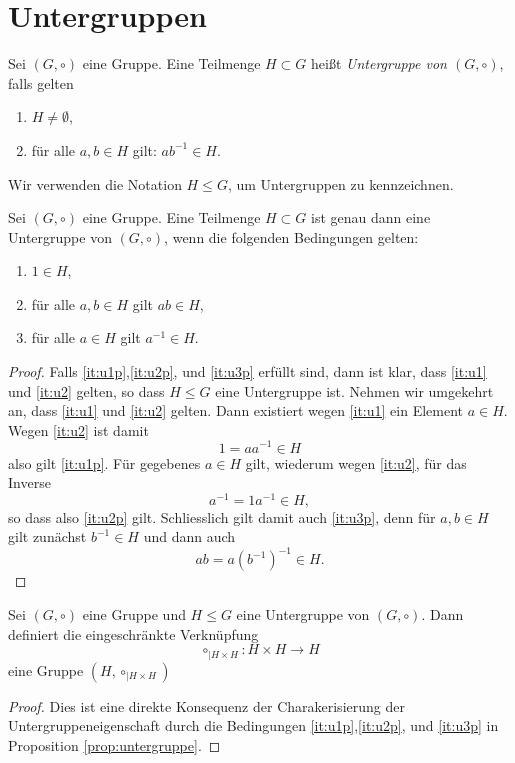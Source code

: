 \documentclass{book}
\begin{document}
\section{Untergruppen}%
\label{sec:untergruppen}

\begin{defi}
    Sei $(G,\circ)$ eine Gruppe. Eine Teilmenge $H \subset G$ heißt {\em Untergruppe von $(G,\circ)$}, falls gelten 
    \begin{enumerate}[leftmargin=1.2cm,label=(U\arabic*)]
        \item\label{it:u1} $H \neq \emptyset$,
        \item\label{it:u2} für alle $a,b \in H$ gilt: $a b^{-1} \in H$. 
    \end{enumerate}
    Wir verwenden die Notation $H \leq G$, um Untergruppen zu kennzeichnen.
\end{defi}

\begin{prop}
    \label{prop:untergruppe}
    Sei $(G,\circ)$ eine Gruppe. Eine Teilmenge $H \subset G$ ist genau dann
    eine Untergruppe von $(G,\circ)$, wenn die folgenden Bedingungen
    gelten:
    \begin{enumerate}[leftmargin=1.2cm,label=(U\arabic*')]
        \item\label{it:u1p} $1 \in H$, 
        \item\label{it:u2p} für alle $a,b \in H$ gilt $ab \in H$, 
        \item\label{it:u3p} für alle $a \in H$ gilt $a^{-1} \in H$. 
    \end{enumerate}
\end{prop}
\begin{proof}
    Falls \ref{it:u1p},\ref{it:u2p}, und \ref{it:u3p} erfüllt sind, dann ist klar, dass
    \ref{it:u1} und \ref{it:u2} gelten, so dass $H \leq G$ eine Untergruppe
    ist. Nehmen wir umgekehrt an, dass \ref{it:u1} und \ref{it:u2} gelten.
    Dann existiert wegen \ref{it:u1} ein Element $a \in H$. Wegen \ref{it:u2} ist damit
    \[
        1 = a a^{-1} \in H
    \]
    also gilt \ref{it:u1p}. Für gegebenes $a \in H$ gilt, wiederum wegen
    \ref{it:u2}, für das Inverse
    \[
        a^{-1} = 1 a^{-1} \in H,
    \]
    so dass also \ref{it:u2p} gilt. Schliesslich gilt damit auch \ref{it:u3p},
    denn für $a,b \in H$ gilt zunächst $b^{-1} \in H$ und dann auch
    \[
        a b = a (b^{-1})^{-1} \in H.
    \]
\end{proof}

\begin{cor}
    Sei $(G,\circ)$ eine Gruppe und $H \leq G$ eine Untergruppe von $(G,\circ)$. Dann definiert die eingeschränkte Verknüpfung
    \[
        \circ_{|H \times H} : H \times H \to H
    \]
    eine Gruppe $(H, \circ_{|H \times H})$
\end{cor}
\begin{proof}
    Dies ist eine direkte Konsequenz der Charakerisierung der
    Untergruppeneigenschaft durch die Bedingungen \ref{it:u1p},\ref{it:u2p},
    und \ref{it:u3p} in Proposition \ref{prop:untergruppe}.
\end{proof}
    
\end{document}

